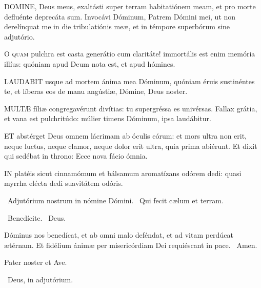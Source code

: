 \lettrine[lines=2]{D}{OMINE}, Deus meus, exaltásti super terram habitatiónem meam, et pro morte defluénte deprecáta sum. Invocávi Dóminum, Patrem Dómini mei, ut non derelínquat me in die tribulatiónis meæ, et in témpore superbórum sine adjutório.


\lettrine[lines=2]{O}{} \textsc{quam} pulchra est casta generátio cum claritáte! immortális est enim memória illíus: quóniam apud Deum nota est, et apud hómines.


\lettrine[lines=2]{L}{AUDABIT} usque ad mortem ánima mea Dóminum, quóniam éruis sustinéntes te, et líberas eos de manu angústiæ, Dómine, Deus noster.


\lettrine[lines=2]{M}{ULTÆ} fíliæ congregavérunt divítias: tu supergréssa es univérsas. Fallax grátia, et vana est pulchritúdo: múlier timens Dóminum, ipsa laudábitur.


\lettrine[lines=2]{E}{T} abstérget Deus omnem lácrimam ab óculis eórum: et mors ultra non erit, neque luctus, neque clamor, neque dolor erit ultra, quia prima abiérunt. Et dixit qui sedébat in throno: Ecce nova fácio ómnia.


\lettrine[lines=2]{I}{N} platéis sicut cinnamómum et bálsamum aromatízans odórem dedi: quasi myrrha elécta dedi suavitátem odóris.

\sectionornament

\V\ Adjutórium nostrum in nómine Dómini. \R\ Qui fecit cælum et terram.

\V\ Benedícite. \R\ Deus.

 Dóminus nos benedícat, et ab omni malo deféndat, et ad vitam perdúcat ætérnam. Et fidélium ánimæ per misericórdiam Dei requiéscant in pace. \R\ Amen.


\sectionornament


Pater noster et Ave.

\V\ Deus, in adjutórium.


